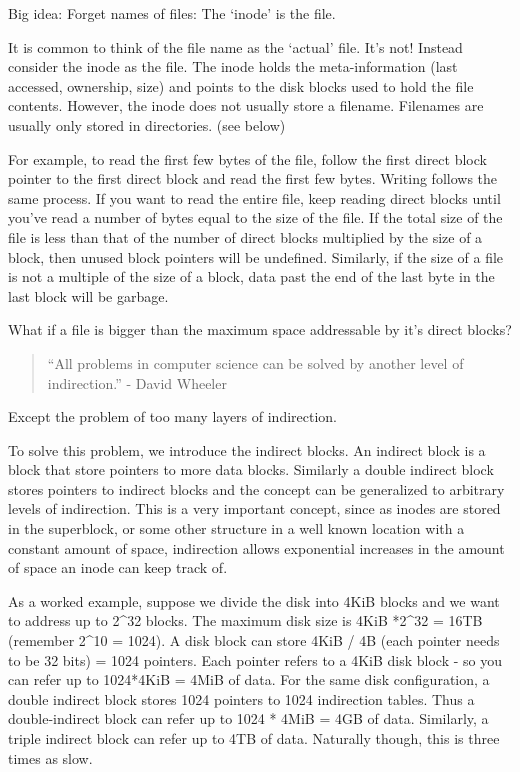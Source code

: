 Big idea: Forget names of files: The `inode' is the file.

It is common to think of the file name as the `actual' file. It's not! Instead consider the inode as the file. The inode holds the meta-information (last accessed, ownership, size) and points to the disk blocks used to hold the file contents. However, the inode does not usually store a filename. Filenames are usually only stored in directories. (see below)

For example, to read the first few bytes of the file, follow the first direct block pointer to the first direct block and read the first few bytes. Writing follows the same process. If you want to read the entire file, keep reading direct blocks until you've read a number of bytes equal to the size of the file. If the total size of the file is less than that of the number of direct blocks multiplied by the size of a block, then unused block pointers will be undefined. Similarly, if the size of a file is not a multiple of the size of a block, data past the end of the last byte in the last block will be garbage.

What if a file is bigger than the maximum space addressable by it's direct blocks?

\begin{quote}
``All problems in computer science can be solved by another level of indirection.'' - David Wheeler
\end{quote}

Except the problem of too many layers of indirection.

To solve this problem, we introduce the indirect blocks. An indirect block is a block that store pointers to more data blocks. Similarly a double indirect block stores pointers to indirect blocks and the concept can be generalized to arbitrary levels of indirection. This is a very important concept, since as inodes are stored in the superblock, or some other structure in a well known location with a constant amount of space, indirection allows exponential increases in the amount of space an inode can keep track of.

As a worked example, suppose we divide the disk into 4KiB blocks and we want to address up to 2\^{}32 blocks. The maximum disk size is 4KiB *2\^{}32 = 16TB (remember 2\^{}10 = 1024). A disk block can store 4KiB / 4B (each pointer needs to be 32 bits) = 1024 pointers. Each pointer refers to a 4KiB disk block - so you can refer up to 1024*4KiB = 4MiB of data. For the same disk configuration, a double indirect block stores 1024 pointers to 1024 indirection tables. Thus a double-indirect block can refer up to 1024 * 4MiB = 4GB of data. Similarly, a triple indirect block can refer up to 4TB of data. Naturally though, this is three times as slow.

